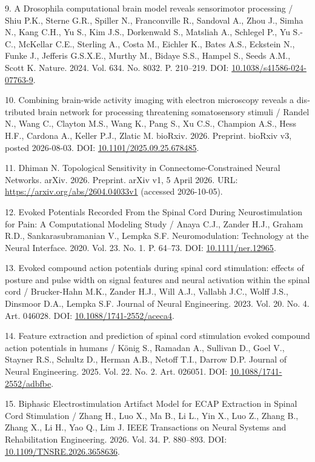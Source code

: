 \documentclass[12pt,a4paper]{article}
\begin{document}
\noindent\foreignlanguage{english}{9. A Drosophila computational brain model reveals sensorimotor processing / Shiu P.K., Sterne G.R., Spiller N., Franconville R., Sandoval A., Zhou J., Simha N., Kang C.H., Yu S., Kim J.S., Dorkenwald S., Matsliah A., Schlegel P., Yu S.-C., McKellar C.E., Sterling A., Costa M., Eichler K., Bates A.S., Eckstein N., Funke J., Jefferis G.S.X.E., Murthy M., Bidaye S.S., Hampel S., Seeds A.M., Scott K. Nature. 2024. Vol. 634. No. 8032. P. 210–219. DOI: \url{10.1038/s41586-024-07763-9}.}\par
\noindent\foreignlanguage{english}{10. Combining brain-wide activity imaging with electron microscopy reveals a distributed brain network for processing threatening somatosensory stimuli / Randel N., Wang C., Clayton M.S., Wang K., Pang S., Xu C.S., Champion A.S., Hess H.F., Cardona A., Keller P.J., Zlatic M. bioRxiv. 2026. Preprint. bioRxiv v3, posted 2026-08-03. DOI: \url{10.1101/2025.09.25.678485}.}\par
\noindent\foreignlanguage{english}{11. Dhiman N. Topological Sensitivity in Connectome-Constrained Neural Networks. arXiv. 2026. Preprint. arXiv v1, 5 April 2026. URL: \url{https://arxiv.org/abs/2604.04033v1} (accessed 2026-10-05).}\par
\noindent\foreignlanguage{english}{12. Evoked Potentials Recorded From the Spinal Cord During Neurostimulation for Pain: A Computational Modeling Study / Anaya C.J., Zander H.J., Graham R.D., Sankarasubramanian V., Lempka S.F. Neuromodulation: Technology at the Neural Interface. 2020. Vol. 23. No. 1. P. 64–73. DOI: \url{10.1111/ner.12965}.}\par
\noindent\foreignlanguage{english}{13. Evoked compound action potentials during spinal cord stimulation: effects of posture and pulse width on signal features and neural activation within the spinal cord / Brucker-Hahn M.K., Zander H.J., Will A.J., Vallabh J.C., Wolff J.S., Dinsmoor D.A., Lempka S.F. Journal of Neural Engineering. 2023. Vol. 20. No. 4. Art. 046028. DOI: \url{10.1088/1741-2552/aceca4}.}\par
\noindent\foreignlanguage{english}{14. Feature extraction and prediction of spinal cord stimulation evoked compound action potentials in humans / König S., Ramadan A., Sullivan D., Goel V., Stayner R.S., Schultz D., Herman A.B., Netoff T.I., Darrow D.P. Journal of Neural Engineering. 2025. Vol. 22. No. 2. Art. 026051. DOI: \url{10.1088/1741-2552/adbfbe}.}\par
\noindent\foreignlanguage{english}{15. Biphasic Electrostimulation Artifact Model for ECAP Extraction in Spinal Cord Stimulation / Zhang H., Luo X., Ma B., Li L., Yin X., Luo Z., Zhang B., Zhang X., Li H., Yao Q., Lim J. IEEE Transactions on Neural Systems and Rehabilitation Engineering. 2026. Vol. 34. P. 880–893. DOI: \url{10.1109/TNSRE.2026.3658636}.}\par
\end{document}
